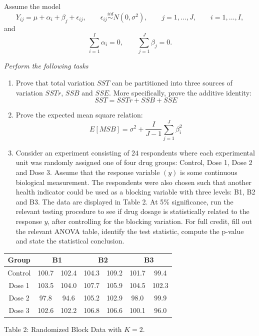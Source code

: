 \documentclass[letterpaper]{article}
\begin{document}
	Assume the model
	\begin{equation}
		Y_{ij}=\mu+\alpha_i+\beta_j+\epsilon_{ij},
		\qquad
		\epsilon_{ij}\overset{iid}{\sim}N(0,\sigma^2),
		\qquad
		j=1,\ldots,J,
		\qquad
		i=1,\ldots,I,
	\end{equation}
	and
	\begin{equation}
		\sum_{i=1}^I \alpha_i=0,
		\qquad
		\sum_{j=1}^J \beta_j=0.
	\end{equation}
	
	\emph{Perform the following tasks}
	\begin{enumerate}
		\item[(i)] Prove that total variation $SST$ can be partitioned into three sources of variation $SSTr$, $SSB$ and $SSE$. More specifically, prove the additive identity:
		\[
		SST=SSTr+SSB+SSE
		\]
		
		\item[(ii)] Prove the expected mean square relation:
		\[
		E[MSB]=\sigma^2+\frac{I}{J-1}\sum_{j=1}^J \beta_i^2
		\]
		
		\item[(iii)] Consider an experiment consisting of $24$ respondents where each experimental unit was randomly assigned one of four drug groups: Control, Dose 1, Dose 2 and Dose 3. Assume that the response variable $(y)$ is some continuous biological measurement. The respondents were also chosen such that another health indicator could be used as a blocking variable with three levels: B1, B2 and B3. The data are displayed in Table 2. At 5\% significance, run the relevant testing procedure to see if drug dosage is statistically related to the response $y$, after controlling for the blocking variation. For full credit, fill out the relevant ANOVA table, identify the test statistic, compute the p-value and state the statistical conclusion.
	\end{enumerate}
	
	\begin{center}
		\begin{tabular}{c c c c c c c}
			\hline
			Group & \multicolumn{2}{c}{B1} & \multicolumn{2}{c}{B2} & \multicolumn{2}{c}{B3} \\
			\hline
			Control & 100.7 & 102.4 & 104.3 & 109.2 & 101.7 & 99.4 \\
			Dose 1  & 103.5 & 104.0 & 107.7 & 105.9 & 104.5 & 102.3 \\
			Dose 2  & 97.8  & 94.6  & 105.2 & 102.9 & 98.0  & 99.9 \\
			Dose 3  & 102.6 & 102.2 & 106.8 & 106.6 & 100.1 & 96.0 \\
			\hline
		\end{tabular}
		
		Table 2: Randomized Block Data with $K=2$.
	\end{center}
	
\end{document}
